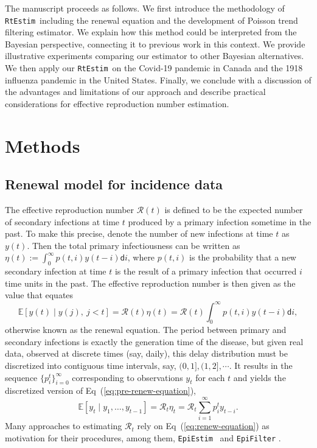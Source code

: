 \documentclass[10pt,letterpaper]{article}
\def\RtEstim{\texttt{RtEstim}}
\def\EpiEstim{\texttt{EpiEstim}}
\def\bbE{\mathbb{E}}
\def\calR{\mathcal{R}}
\def\diff{\mathsf{d}}
\newcommand{\citep}[1]{\cite{#1}}
\renewcommand{\eqref}[1]{Eq~(\ref{#1})}
\begin{document}
The manuscript proceeds as follows. We first introduce the methodology of
\RtEstim\ including the renewal equation and the development of Poisson
trend filtering estimator. We explain how this method could be interpreted from
the Bayesian perspective, connecting it to previous work in this context. We
provide illustrative experiments comparing our estimator to other Bayesian alternatives. 
We then apply our \RtEstim\ on the Covid-19 pandemic in Canada and 
the 1918 influenza pandemic in the United States. Finally, we conclude 
with a discussion of the advantages and limitations of our approach and describe 
practical considerations for effective reproduction number estimation.


\section{Methods}

\subsection{Renewal model for incidence data} 

The effective reproduction number $\calR(t)$ is defined to be the expected
number of secondary infections at time $t$ produced by a primary infection
sometime in the past. To make this precise, denote the number of new infections
at time $t$ as $y(t)$. Then the total primary infectiousness can be written as
$\eta(t) := \int_0^{\infty} p(t,i) y(t-i) \diff i$, where $p(t,i)$ is the
probability that a new secondary infection at time $t$ is the result of a primary infection
that occurred $i$ time units in the past. The effective reproduction number is then given
as the value that equates
\begin{equation} \label{eq:pre-renew-equation}
  \bbE[y(t) \mid y(j),\ j<t]=\calR(t)\eta(t)=\calR(t)\int_0^\infty p(t,i)y(t-i)\diff i,
\end{equation}
otherwise known as the renewal equation. The period between primary and secondary
infections is exactly the generation time of the disease, but given real data,
observed at discrete times (say, daily), this delay distribution must be discretized
into contiguous time intervals,
say, $(0,1], (1,2], \cdots$. It results in the sequence $\{p^t_i\}_{i=0}^\infty$
corresponding to observations $y_t$ for each $t$ and yields the
discretized version of \eqref{eq:pre-renew-equation},
\begin{equation} \label{eq:renew-equation}
  \bbE[y_t \mid y_1,\ldots,y_{t-1}]=\calR_t\eta_t=\calR_t\sum_{i = 1}^\infty p^t_i y_{t-i}.
\end{equation}
Many approaches to estimating $\calR_t$ rely on \eqref{eq:renew-equation} as
motivation for their procedures, among them, \EpiEstim\ \citep{cori2013new} 
and \texttt{EpiFilter} \citep{parag2021improved}. 
\end{document}
